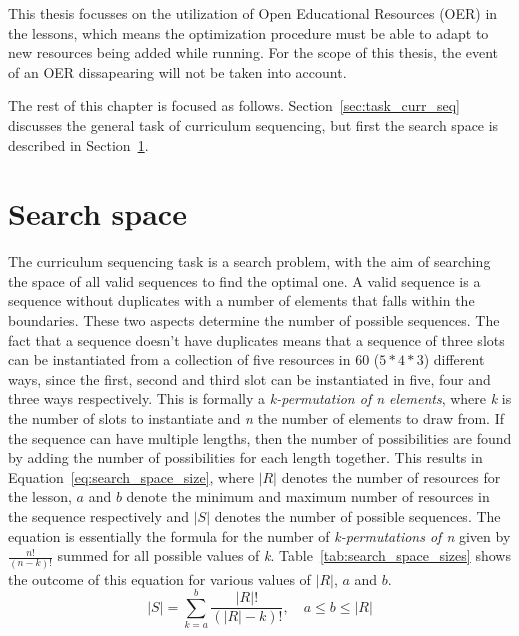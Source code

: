 This thesis focusses on the utilization of Open Educational Resources (OER) in the
lessons, which means the optimization procedure must be able to adapt to new
resources being added while running. For the scope of this thesis, the event of
an OER dissapearing will not be taken into account.

The rest of this chapter is focused as follows. Section~\ref{sec:task_curr_seq}
discusses the general task of curriculum sequencing, but first the search space
is described in Section~\ref{sec:task_search_space}.

\section{Search space}
\label{sec:task_search_space}
The curriculum sequencing task is a search problem, with the aim of searching the
space of all valid sequences to find the optimal one. A valid sequence is a
sequence without duplicates with a number of elements that falls within the
boundaries. These two aspects determine the number of possible sequences. 
The fact that a sequence doesn't have duplicates means that a
sequence of three slots can be instantiated from a collection of five resources in
60 ($5*4*3$) different ways, since the first, second and third slot can be
instantiated in five, four and three ways respectively. This is formally a
\emph{k-permutation of n elements}, where \emph{k} is the number of slots to
instantiate and \emph{n} the number of elements to draw from.
If the sequence can have multiple lengths, then the number of
possibilities are found by adding the
number of possibilities for each length together. This results in
Equation~\ref{eq:search_space_size}, where $|R|$ denotes the number of
resources for the lesson, $a$ and $b$ denote the minimum and maximum number of
resources in the sequence respectively and $|S|$ denotes the number of possible
sequences. The equation is essentially the formula for the number of
\emph{k-permutations of n} given by $\tfrac{n!}{(n-k)!}$ summed for all
possible values of \emph{k}.
Table~\ref{tab:search_space_sizes} shows the outcome of this 
equation for various values of $|R|$, $a$ and $b$.
\begin{equation}
	\label{eq:search_space_size}
	|S| = \sum_{k=a}^{b} \frac{|R|!}{(|R|-k)!}, \quad a \le b \le |R|
\end{equation}
